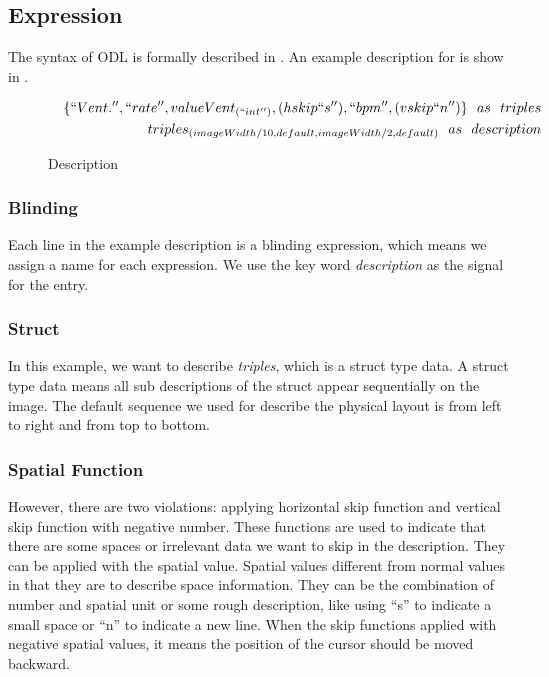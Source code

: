 \subsection{Expression}
The syntax of ODL is formally described in 
. An example 
description for  is show in 
. 



\begin{figure}[h]
\begin{eqnarray*}
&&\{``Vent.'', ``rate'', valueVent_{(``int'')}, (hskip ``s''), ``bpm'', (vskip ``n'')\} ~~ as ~~ triples\\
&&triples_{(imageWidth/10, default, imageWidth/2, default)} ~~ as ~~ description\\
\end{eqnarray*}
\caption{Description}\label{fig:description}
\end{figure}

\subsubsection*{Blinding}
Each line in the example description is a blinding expression, which 
means we assign a name for each expression. 
We use the key word \emph{description} as the signal for the 
entry. 
\subsubsection*{Struct}
In this example, we want to describe \emph{triples}, which is a struct type data. 
A struct type data means all sub descriptions of the struct appear sequentially on 
the image. The default sequence we used for describe the physical layout 
is from left to right and from top to bottom. 
\subsubsection*{Spatial Function}
However, there are two violations: 
applying horizontal skip function and vertical skip function with negative 
number. These functions are used to indicate that there are some spaces or irrelevant 
data we want to skip in the description. They can be applied with the spatial 
value. 
Spatial values different from normal values in that they are to describe space 
information. 
They can be the combination of number and spatial unit or some rough description, 
like using ``s'' to indicate a small space or ``n'' to indicate a new line. 
When the skip functions applied with negative spatial values, it means 
the position of the cursor should be moved backward. 
